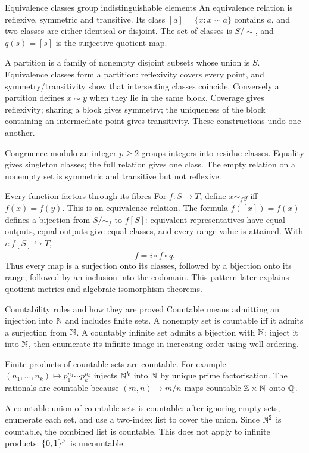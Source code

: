 \begin{note}{Equivalence classes group indistinguishable elements}
An equivalence relation is reflexive, symmetric and transitive. Its class $[a]=\{x:x\sim a\}$ contains $a$, and two classes are either identical or disjoint. The set of classes is $S/{\sim}$, and $q(s)=[s]$ is the surjective quotient map.

A partition is a family of nonempty disjoint subsets whose union is $S$. Equivalence classes form a partition: reflexivity covers every point, and symmetry/transitivity show that intersecting classes coincide. Conversely a partition defines $x\sim y$ when they lie in the same block. Coverage gives reflexivity; sharing a block gives symmetry; the uniqueness of the block containing an intermediate point gives transitivity. These constructions undo one another.

Congruence modulo an integer $p\ge2$ groups integers into residue classes. Equality gives singleton classes; the full relation gives one class. The empty relation on a nonempty set is symmetric and transitive but not reflexive.
\end{note}
\begin{note}{Every function factors through its fibres}
For $f:S\to T$, define $x\sim_f y$ iff $f(x)=f(y)$. This is an equivalence relation. The formula $\widetilde f([x])=f(x)$ defines a bijection from $S/{\sim_f}$ to $f[S]$: equivalent representatives have equal outputs, equal outputs give equal classes, and every range value is attained. With $i:f[S]\hookrightarrow T$,
\[f=i\circ\widetilde f\circ q.\]
Thus every map is a surjection onto its classes, followed by a bijection onto its range, followed by an inclusion into the codomain. This pattern later explains quotient metrics and algebraic isomorphism theorems.
\end{note}
\begin{note}{Countability rules and how they are proved}
Countable means admitting an injection into $\mathbb N$ and includes finite sets. A nonempty set is countable iff it admits a surjection from $\mathbb N$. A countably infinite set admits a bijection with $\mathbb N$: inject it into $\mathbb N$, then enumerate its infinite image in increasing order using well-ordering.

Finite products of countable sets are countable. For example $(n_1,\ldots,n_k)\mapsto p_1^{n_1}\cdots p_k^{n_k}$ injects $\mathbb N^k$ into $\mathbb N$ by unique prime factorisation. The rationals are countable because $(m,n)\mapsto m/n$ maps countable $\mathbb Z\times\mathbb N$ onto $\mathbb Q$.

A countable union of countable sets is countable: after ignoring empty sets, enumerate each set, and use a two-index list to cover the union. Since $\mathbb N^2$ is countable, the combined list is countable. This does not apply to infinite products: $\{0,1\}^{\mathbb N}$ is uncountable.
\end{note}

